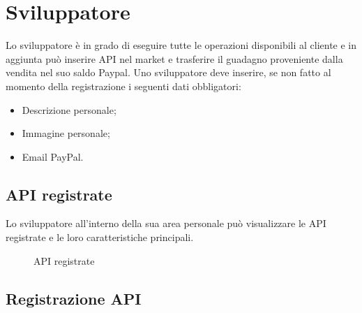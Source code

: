 \newpage
\section{Sviluppatore}
Lo sviluppatore è in grado di eseguire tutte le operazioni disponibili al cliente e in aggiunta può inserire API nel market e trasferire il guadagno proveniente dalla vendita nel suo saldo Paypal.
Uno sviluppatore deve inserire, se non fatto al momento della registrazione i seguenti dati obbligatori:
	
\begin{itemize}
	\item Descrizione personale;
	\item Immagine personale;
	\item Email PayPal.
\end{itemize}


\subsection{API registrate}
Lo sviluppatore all'interno della sua area personale può visualizzare le API registrate e le loro caratteristiche principali.

\label{API registrate}
\begin{figure}[H]
	\centering
	\caption{API registrate}
\end{figure}

\subsection{Registrazione API}

